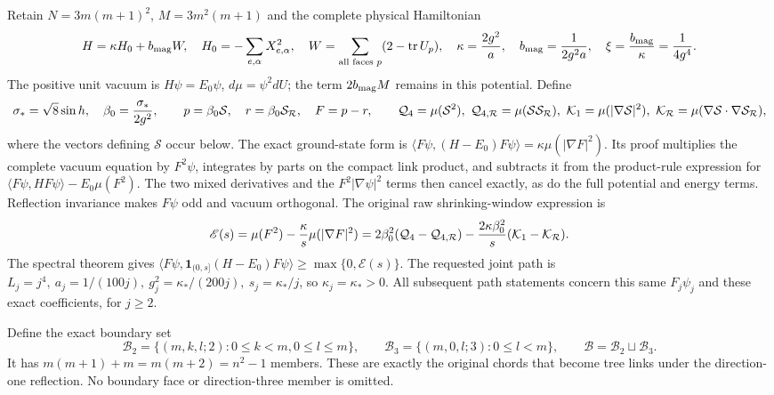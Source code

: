 \documentclass[11pt]{article}
\begin{document}
Retain \(N=3m(m+1)^2\), \(M=3m^2(m+1)\) and the complete physical
Hamiltonian
\[
 H=\kappa H_0+b_{\rm mag}W,\quad
 H_0=-\sum_{e,\alpha}X_{e,\alpha}^2,\quad
 W=\sum_{\text{all faces }p}(2-\operatorname{tr}U_p),\quad
 \kappa={2g^2\over a},\quad b_{\rm mag}={1\over2g^2a},
 \quad \xi={b_{\rm mag}\over\kappa}={1\over4g^4}.
\]
The positive unit vacuum is \(H\psi=E_0\psi\), \(d\mu=\psi^2dU\);
the term \(2b_{\rm mag}M\) remains in this potential. Define
\[
 \sigma_*=\sqrt8\sin h,\quad\beta_0={\sigma_*\over2g^2},\qquad
 p=\beta_0\mathcal S,\quad r=\beta_0\mathcal S_{\mathcal R},
 \quad F=p-r,\qquad
 \mathcal Q_4=\mu(\mathcal S^2),\
 \mathcal Q_{4,\mathcal R}=\mu(\mathcal S\mathcal S_{\mathcal R}),\
 \mathcal K_1=\mu(|\nabla\mathcal S|^2),\
 \mathcal K_{\mathcal R}
   =\mu(\nabla\mathcal S\cdot\nabla\mathcal S_{\mathcal R}),
\]
where the vectors defining \(\mathcal S\) occur below. The exact
ground-state form is
\(\langle F\psi,(H-E_0)F\psi\rangle
=\kappa\mu(|\nabla F|^2)\).
Its proof multiplies the complete vacuum equation by \(F^2\psi\),
integrates by parts on the compact link product, and subtracts it
from the product-rule expression for
\(\langle F\psi,H F\psi\rangle-E_0\mu(F^2)\).
The two mixed derivatives and the \(F^2|\nabla\psi|^2\) terms then
cancel exactly, as do the full potential and energy terms.
Reflection invariance makes \(F\psi\) odd and vacuum orthogonal.
The original raw shrinking-window expression is
\[
 \mathscr E(s)=\mu(F^2)-{\kappa\over s}\mu(|\nabla F|^2)
 =2\beta_0^2(\mathcal Q_4-\mathcal Q_{4,\mathcal R})
   -{2\kappa\beta_0^2\over s}(\mathcal K_1-\mathcal K_{\mathcal R}).
\]
The spectral theorem gives
\(\langle F\psi,\mathbf1_{(0,s]}(H-E_0)F\psi\rangle
\ge\max\{0,\mathscr E(s)\}\). The requested joint path is
\(L_j=j^4,\ a_j=1/(100j),\
g_j^2=\kappa_*/(200j),\ s_j=\kappa_*/j\), so
\(\kappa_j=\kappa_*>0\). All subsequent path statements concern
this same \(F_j\psi_j\) and these exact coefficients, for \(j\ge2\).

Define the exact boundary set
\[
\mathcal B_2=\{(m,k,l;2):0\le k<m,0\le l\le m\},\qquad
\mathcal B_3=\{(m,0,l;3):0\le l<m\},\qquad
\mathcal B=\mathcal B_2\sqcup\mathcal B_3.
\tag{JP2}
\]
It has \(m(m+1)+m=m(m+2)=n^2-1\) members. These are exactly the
original chords that become tree links under the direction-one
reflection. No boundary face or direction-three member is omitted.
\end{document}
